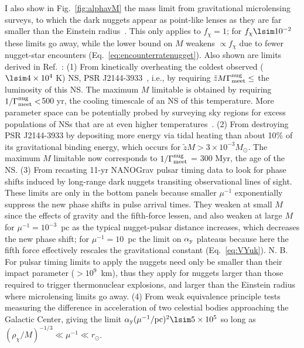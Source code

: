 \documentclass[
    twocolumn,
	prd,
        amssymb,
	preprintnumbers,
	secnumarabic,
	nofootinbib,
	superscriptaddress]{revtex4-1}
\begin{document}
I also show in Fig.~\ref{fig:alphavM} the mass limit from gravitational microlensing surveys, to which the dark nuggets appear as point-like lenses as they are far smaller than the Einstein radius~\cite{ECOlocation1,ECOlocation2}. 
This only applies to $f_\chi = 1$; for $f_\chi \lsim 10^{-2}$ these limits go away, while the lower bound on $M$ weakens $\propto f_\chi$ due to fewer nugget-star encounters (Eq.~\eqref{eq:encounterratenugget}).
Also shown are limits derived in Ref.~\cite{GreshamLeeZurek:2022biw}:
(1) From kinetically overheating the coldest observed ($\lsim 4 \times 10^4$ K) NS, PSR J2144-3933~\cite{coldestNSHST}, i.e., by requiring $\tilde z M \Gamma^{\rm nug}_{\rm meet} \leq$ the luminosity of this NS. 
The maximum $M$ limitable is obtained by requiring $1/\Gamma^{\rm nug}_{\rm meet} < $500 yr, the cooling timescale of an NS of this temperature.
More parameter space can be potentially probed by surveying sky regions for excess populations of NSs that are at even higher temperatures~\cite{NSvIR:clumps2021}. 
(2) From destroying PSR J2144-3933 by depositing more energy via tidal heating than about 10\% of its gravitational binding energy, which occurs for $\tilde z M > 3\times10^{-3} M_\odot$.
The maximum $M$ limitable now corresponds to $1/\Gamma^{\rm nug}_{\rm meet}$ = 300 Myr, the age of the NS. 
(3) From recasting 11-yr NANOGrav pulsar timing data to look for phase shifts induced by long-range dark nuggets transiting observational lines of sight.
These limits are only in the bottom panels because smaller $\mu^{-1}$ exponentially suppress the new phase shifts in pulse arrival times.
They weaken at small $M$ since the effects of gravity and the fifth-force lessen, and also weaken at large $M$ for $\mu^{-1} = 10^{-3}$~pc as the typical nugget-pulsar distance increases, which decreases the new phase shift; for $\mu^{-1} = 10$~pc the limit on $\alpha_{\rm y}$ plateaus because here the fifth force effectively rescales the gravitational constant (Eq.~\eqref{eq:VYuk}).
N. B. For pulsar timing limits to apply the nuggets need only be smaller than their impact parameter ($> 10^9$~km), thus they apply for nuggets larger than those required to trigger thermonuclear explosions, and larger than the Einstein radius where microlensing limits go away. 
(4) From weak equivalence principle tests measuring the difference in acceleration of two celestial bodies approaching the Galactic Center, giving the limit $\alpha_{\rm y} (\mu^{-1}/{\rm pc})^2 \lsim 5 \times 10^5$ so long as $(\rho_\chi/M)^{-1/3} \ll \mu^{-1} \ll r_\odot$.
\end{document}
